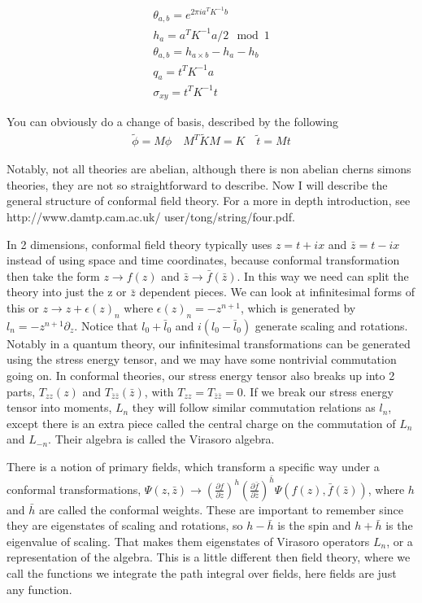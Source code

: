 \begin{align}
\theta_{a,b} = e^{2\pi i a^T K^{-1} b} \label{eq:transform1}\\
h_a = a^T K^{-1} a /2 \mod 1 \label{eq:transform2}\\
\theta_{a,b}= h_{a\times b}-h_a-h_b  \label{eq:transform3}\\
q_a = t^TK^{-1}a \label{eq:transform4}\\
\sigma_{xy} = t^TK^{-1}t \label{eq:transform5}
\end{align}

You can obviously do a change of basis, described by the following 
\begin{align}
\tilde{\phi}=M\phi \quad M^T\tilde{K}M=K \quad \tilde{t}=Mt
\end{align}


Notably, not all theories are abelian, although there is non abelian cherns simons theories, they are not so straightforward to describe. Now I will describe the general structure of conformal field theory.  For a more in depth introduction, see http://www.damtp.cam.ac.uk/ user/tong/string/four.pdf. 

In 2 dimensions, conformal field theory typically uses $z = t + ix$  and $\bar{z}= t - ix$ instead of using space and time coordinates, because conformal transformation then take the form $z \rightarrow f(z)$ and $\bar{z} \rightarrow \bar{f}(\bar{z})$. In this way we need can split the theory into just the z or $\bar{z}$ dependent pieces. We can look at infinitesimal forms of this or $z \rightarrow z + \epsilon(z)_n$ where $\epsilon(z)_n = -z^{n+1}$, which is generated by $l_n = -z^{n+1}\partial_z$. Notice that $l_0+\bar{l}_0$ and $i(l_0-\bar{l}_0)$ generate scaling and rotations. Notably in a quantum theory, our infinitesimal transformations can be generated using the stress energy tensor, and we may have some nontrivial commutation going on. In conformal theories, our stress energy tensor also breaks up into 2 parts, $T_{zz}(z)$ and $T_{\bar{z}\bar{z}}(\bar{z})$, with $T_{zz} =T_{\bar{z}\bar{z}}=0$. If we break our stress energy tensor into moments, $L_n$ they will follow similar commutation relations as $l_n$, except there is an extra piece called the central charge on the commutation of $L_n$ and $L_{-n}$. Their algebra is called the Virasoro algebra.

There is a notion of primary fields, which transform a specific way under a conformal transformations, $ \Psi(z,\bar{z}) \rightarrow (\frac{\partial f}{\partial z})^h (\frac{\partial \bar{f}}{\partial \bar{z}})^{\bar{h}}  \Psi(f(z),\bar{f}(\bar{z}))$, where $h$ and $\bar{h}$ are called the conformal weights. These are important to remember since they are eigenstates of scaling and rotations, so $h-\bar{h}$ is the spin and $h+\bar{h}$ is the eigenvalue of scaling. That makes them eigenstates of Virasoro operators $L_n$, or a representation of the algebra. This is a little different then field theory, where we call the functions we integrate the path integral over fields, here fields are just any function.

